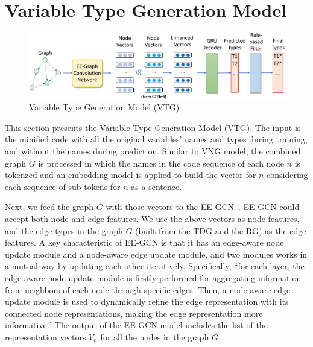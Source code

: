 \section{Variable Type Generation Model}
\label{sec:type-gen}

\begin{figure}[ht]
	\begin{center}
	  \includegraphics[width=4.8in]{figures/type-gen-model-2}
          \vspace{-6pt}
		\caption{Variable Type Generation Model (VTG)}
		\label{fig:type-gen}
	\end{center}
\end{figure}

This section presents the Variable Type Generation Model (VTG).  The
input is the minified code with all the original variables' names and
types during training, and without the names during
prediction. Similar to VNG model, the combined graph $G$ is processed
in which the names in the code sequence of each node $n$ is tokenzed
and an embedding model is applied to build the vector for $n$
considering each sequence of sub-tokens for $n$ as a sentence.


Next, we feed the graph $G$ with those vectors to the
EE-GCN~\cite{ee-gcn}. EE-GCN could accept both node and edge features.
We use the above vectors as node features, and the edge types in the
graph $G$ (built from the TDG and the RG) as the edge features. A key
characteristic of EE-GCN is that it has an edge-aware node update
module and a node-aware edge update module, and two modules works in a
mutual way by updating each other iteratively. Specifically, ``for
each layer, the edge-aware node update module is firstly performed for
aggregating information from neighbors of each node through specific
edges. Then, a node-aware edge update module is used to dynamically
refine the edge representation with its connected node
representations, making the edge representation more informative.''
The output of the EE-GCN model includes the list of the representation
vectors $V_n$ for all the nodes in the graph $G$.

